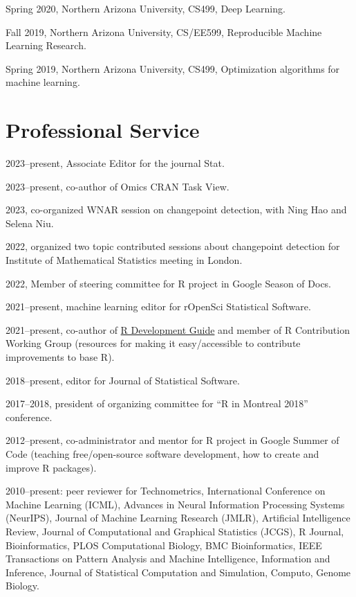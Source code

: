 \documentclass[margin,line]{res}
\begin{document}
\begin{resume}
Spring 2020, Northern Arizona University, CS499, Deep Learning.

Fall 2019, Northern Arizona University, CS/EE599, Reproducible Machine
Learning Research.

Spring 2019, Northern Arizona University, CS499, Optimization
algorithms for machine learning.

\section{\sc Professional Service}

2023--present, Associate Editor for the journal Stat.

2023--present, co-author of Omics CRAN Task View.

2023, co-organized WNAR session on changepoint detection, with Ning
Hao and Selena Niu.

2022, organized two topic contributed sessions about changepoint
detection for Institute of Mathematical Statistics meeting in London.

2022, Member of steering committee for R project in Google Season of Docs.

2021--present, machine learning editor for rOpenSci Statistical Software.

2021--present, co-author of
\href{https://contributor.r-project.org/rdevguide/}{R Development
  Guide} and member of R Contribution Working Group (resources for
making it easy/accessible to contribute improvements to base R).

2018--present, editor for Journal of Statistical Software.

2017--2018, president of organizing committee for ``R in Montreal
2018'' conference.

2012--present, co-administrator and mentor for R project in Google
Summer of Code (teaching free/open-source software development, how to
create and improve R packages).

2010--present: peer reviewer for Technometrics, International
Conference on Machine Learning (ICML), Advances in Neural Information
Processing Systems (NeurIPS), Journal of Machine Learning Research
(JMLR), Artificial Intelligence Review, Journal of Computational and
Graphical Statistics (JCGS), R Journal, Bioinformatics, PLOS
Computational Biology, BMC Bioinformatics, IEEE Transactions on
Pattern Analysis and Machine Intelligence, Information and Inference,
Journal of Statistical Computation and Simulation, Computo, Genome
Biology.


\end{resume}
\end{document}
